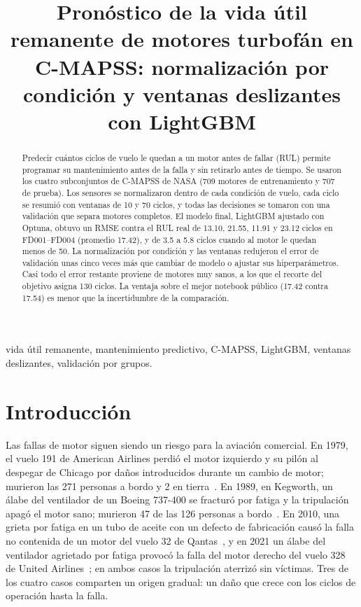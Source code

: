 \documentclass[conference]{IEEEtran}
\begin{document}
\title{Pronóstico de la vida útil remanente de motores turbofán en C-MAPSS: normalización por condición y ventanas deslizantes con LightGBM}

\author{
}

\maketitle

\begin{abstract}
Predecir cuántos ciclos de vuelo le quedan a un motor antes de fallar (RUL) permite programar su mantenimiento antes de la falla y sin retirarlo antes de tiempo. Se usaron los cuatro subconjuntos de C-MAPSS de NASA (709 motores de entrenamiento y 707 de prueba). Los sensores se normalizaron dentro de cada condición de vuelo, cada ciclo se resumió con ventanas de 10 y 70 ciclos, y todas las decisiones se tomaron con una validación que separa motores completos. El modelo final, LightGBM ajustado con Optuna, obtuvo un RMSE contra el RUL real de 13.10, 21.55, 11.91 y 23.12 ciclos en FD001--FD004 (promedio 17.42), y de 3.5 a 5.8 ciclos cuando al motor le quedan menos de 50. La normalización por condición y las ventanas redujeron el error de validación unas cinco veces más que cambiar de modelo o ajustar sus hiperparámetros. Casi todo el error restante proviene de motores muy sanos, a los que el recorte del objetivo asigna 130 ciclos. La ventaja sobre el mejor notebook público (17.42 contra 17.54) es menor que la incertidumbre de la comparación.
\end{abstract}

\begin{IEEEkeywords}
vida útil remanente, mantenimiento predictivo, C-MAPSS, LightGBM, ventanas deslizantes, validación por grupos.
\end{IEEEkeywords}

\section{Introducción}

Las fallas de motor siguen siendo un riesgo para la aviación comercial. En 1979, el vuelo 191 de American Airlines perdió el motor izquierdo y su pilón al despegar de Chicago por daños introducidos durante un cambio de motor; murieron las 271 personas a bordo y 2 en tierra~\cite{ntsb191}. En 1989, en Kegworth, un álabe del ventilador de un Boeing 737-400 se fracturó por fatiga y la tripulación apagó el motor sano; murieron 47 de las 126 personas a bordo~\cite{aaib92}. En 2010, una grieta por fatiga en un tubo de aceite con un defecto de fabricación causó la falla no contenida de un motor del vuelo 32 de Qantas~\cite{atsb32}, y en 2021 un álabe del ventilador agrietado por fatiga provocó la falla del motor derecho del vuelo 328 de United Airlines~\cite{ntsb328}; en ambos casos la tripulación aterrizó sin víctimas. Tres de los cuatro casos comparten un origen gradual: un daño que crece con los ciclos de operación hasta la falla.
\end{document}
